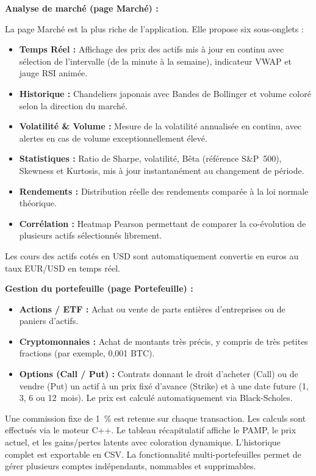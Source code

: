 \documentclass[a4paper, 12pt, twoside]{article}
\begin{document}
\textbf{Analyse de marché (page Marché) :}

La page Marché est la plus riche de l'application. Elle propose six
sous-onglets :

\begin{itemize}
    \item \textbf{Temps Réel :} Affichage des prix des actifs mis à jour
          en continu avec sélection de l'intervalle (de la minute à la
          semaine), indicateur VWAP et jauge RSI animée.
    \item \textbf{Historique :} Chandeliers japonais avec Bandes de
          Bollinger et volume coloré selon la direction du marché.
    \item \textbf{Volatilité \& Volume :} Mesure de la volatilité
          annualisée en continu, avec alertes en cas de volume
          exceptionnellement élevé.
    \item \textbf{Statistiques :} Ratio de Sharpe, volatilité, Bêta
          (référence S\&P~500), Skewness et Kurtosis, mis à jour
          instantanément au changement de période.
    \item \textbf{Rendements :} Distribution réelle des rendements
          comparée à la loi normale théorique.
    \item \textbf{Corrélation :} Heatmap Pearson permettant de comparer
          la co-évolution de plusieurs actifs sélectionnés librement.
\end{itemize}

Les cours des actifs cotés en USD sont automatiquement convertis en
euros au taux EUR/USD en temps réel.

\textbf{Gestion du portefeuille (page Portefeuille) :}

\begin{itemize}
    \item \textbf{Actions / ETF :} Achat ou vente de parts entières
          d'entreprises ou de paniers d'actifs.
    \item \textbf{Cryptomonnaies :} Achat de montants très précis,
          y compris de très petites fractions (par exemple, 0,001 BTC).
    \item \textbf{Options (Call / Put) :} Contrats donnant le droit
          d'acheter (Call) ou de vendre (Put) un actif à un prix fixé
          d'avance (Strike) et à une date future (1, 3, 6 ou 12~mois).
          Le prix est calculé automatiquement via Black-Scholes.
\end{itemize}

Une commission fixe de 1~\% est retenue sur chaque transaction. Les
calculs sont effectués via le moteur C++. Le tableau récapitulatif
affiche le PAMP, le prix actuel, et les gains/pertes latents avec
coloration dynamique. L'historique complet est exportable en CSV.
La fonctionnalité multi-portefeuilles permet de gérer plusieurs comptes
indépendants, nommables et supprimables.
\end{document}
